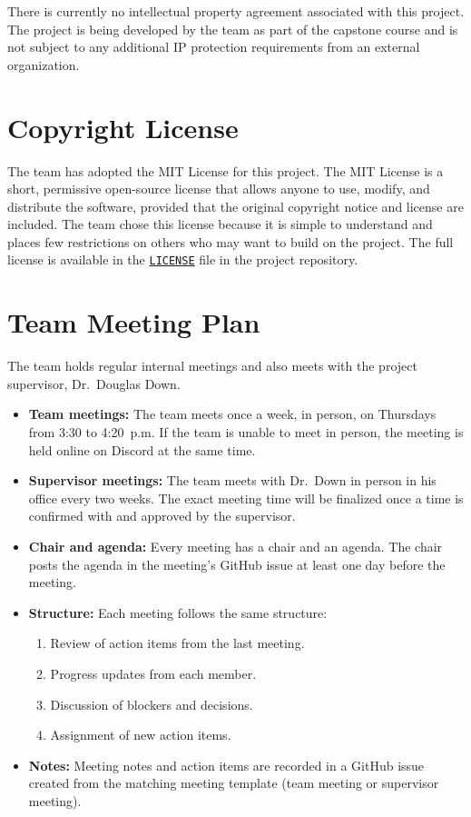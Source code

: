 \documentclass{article}
\begin{document}
There is currently no intellectual property agreement associated with this
project. The project is being developed by the team as part of the capstone
course and is not subject to any additional IP protection requirements from an
external organization.

\section{Copyright License}

The team has adopted the MIT License for this project. The MIT License is a
short, permissive open-source license that allows anyone to use, modify, and
distribute the software, provided that the original copyright notice and
license are included. The team chose this license because it is simple to
understand and places few restrictions on others who may want to build on the
project. The full license is available in the
\href{https://github.com/SoftwareMandems/FPVR/blob/main/LICENSE}{\texttt{LICENSE}}
file in the project repository.

\section{Team Meeting Plan}

The team holds regular internal meetings and also meets with the project
supervisor, Dr.\ Douglas Down.

\begin{itemize}
  \item \textbf{Team meetings:} The team meets once a week, in person, on
  Thursdays from 3:30 to 4:20~p.m. If the team is unable to meet in person,
  the meeting is held online on Discord at the same time.
  \item \textbf{Supervisor meetings:} The team meets with Dr.\ Down in person
  in his office every two weeks. The exact meeting time will be finalized once
  a time is confirmed with and approved by the supervisor.
  \item \textbf{Chair and agenda:} Every meeting has a chair and an agenda. The
  chair posts the agenda in the meeting's GitHub issue at least one day before
  the meeting.
  \item \textbf{Structure:} Each meeting follows the same structure:
  \begin{enumerate}
    \item Review of action items from the last meeting.
    \item Progress updates from each member.
    \item Discussion of blockers and decisions.
    \item Assignment of new action items.
  \end{enumerate}
  \item \textbf{Notes:} Meeting notes and action items are recorded in a
  GitHub issue created from the matching meeting template (team meeting or
  supervisor meeting).
\end{itemize}
\end{document}
